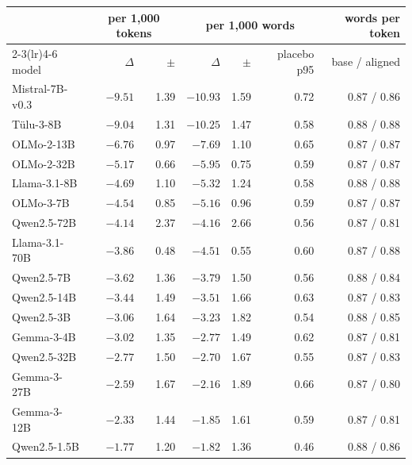 \begin{center}\scriptsize\setlength{\tabcolsep}{4pt}
\begin{tabular}{lrrrrrr}\toprule
 & \multicolumn{2}{c}{per 1,000 tokens} & \multicolumn{3}{c}{per 1,000 words} & words per token \\
\cmidrule(lr){2-3}\cmidrule(lr){4-6}
model & $\Delta$ & $\pm$ & $\Delta$ & $\pm$ & placebo p95 & base / aligned \\ \midrule
Mistral-7B-v0.3 & $\mathbf{-9.51}$ & 1.39 & $\mathbf{-10.93}$ & 1.59 & 0.72 & 0.87 / 0.86 \\
T\"ulu-3-8B & $\mathbf{-9.04}$ & 1.31 & $\mathbf{-10.25}$ & 1.47 & 0.58 & 0.88 / 0.88 \\
OLMo-2-13B & $\mathbf{-6.76}$ & 0.97 & $\mathbf{-7.69}$ & 1.10 & 0.65 & 0.87 / 0.87 \\
OLMo-2-32B & $\mathbf{-5.17}$ & 0.66 & $\mathbf{-5.95}$ & 0.75 & 0.59 & 0.87 / 0.87 \\
Llama-3.1-8B & $\mathbf{-4.69}$ & 1.10 & $\mathbf{-5.32}$ & 1.24 & 0.58 & 0.88 / 0.88 \\
OLMo-3-7B & $\mathbf{-4.54}$ & 0.85 & $\mathbf{-5.16}$ & 0.96 & 0.59 & 0.87 / 0.87 \\
Qwen2.5-72B & $\mathbf{-4.14}$ & 2.37 & $\mathbf{-4.16}$ & 2.66 & 0.56 & 0.87 / 0.81 \\
Llama-3.1-70B & $\mathbf{-3.86}$ & 0.48 & $\mathbf{-4.51}$ & 0.55 & 0.60 & 0.87 / 0.88 \\
Qwen2.5-7B & $\mathbf{-3.62}$ & 1.36 & $\mathbf{-3.79}$ & 1.50 & 0.56 & 0.88 / 0.84 \\
Qwen2.5-14B & $\mathbf{-3.44}$ & 1.49 & $\mathbf{-3.51}$ & 1.66 & 0.63 & 0.87 / 0.83 \\
Qwen2.5-3B & $\mathbf{-3.06}$ & 1.64 & $\mathbf{-3.23}$ & 1.82 & 0.54 & 0.88 / 0.85 \\
Gemma-3-4B & $\mathbf{-3.02}$ & 1.35 & $\mathbf{-2.77}$ & 1.49 & 0.62 & 0.87 / 0.81 \\
Qwen2.5-32B & $\mathbf{-2.77}$ & 1.50 & $\mathbf{-2.70}$ & 1.67 & 0.55 & 0.87 / 0.83 \\
Gemma-3-27B & $\mathbf{-2.59}$ & 1.67 & $\mathbf{-2.16}$ & 1.89 & 0.66 & 0.87 / 0.80 \\
Gemma-3-12B & $\mathbf{-2.33}$ & 1.44 & $\mathbf{-1.85}$ & 1.61 & 0.59 & 0.87 / 0.81 \\
Qwen2.5-1.5B & $\mathbf{-1.77}$ & 1.20 & $\mathbf{-1.82}$ & 1.36 & 0.46 & 0.88 / 0.86 \\
\bottomrule\end{tabular}\end{center}
